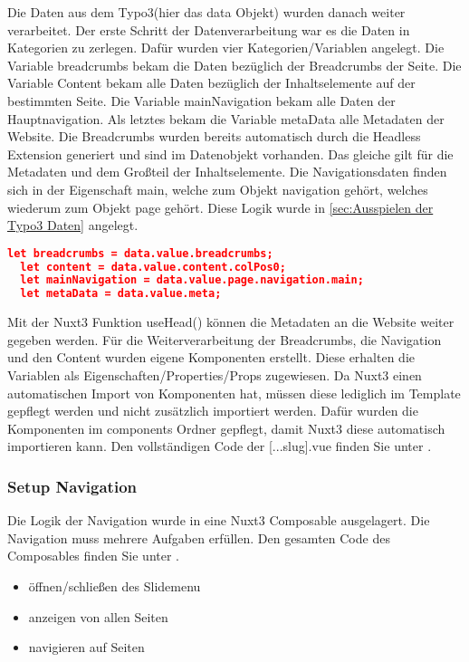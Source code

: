 Die Daten aus dem Typo3(hier das data Objekt) wurden danach weiter verarbeitet. Der erste Schritt der Datenverarbeitung war es die Daten in Kategorien zu zerlegen. Dafür wurden vier Kategorien/Variablen angelegt. Die Variable breadcrumbs bekam die Daten bezüglich der Breadcrumbs der Seite. Die Variable Content bekam alle Daten bezüglich der Inhaltselemente auf der bestimmten Seite. Die Variable mainNavigation bekam alle Daten der Hauptnavigation. Als letztes bekam die Variable metaData alle Metadaten der Website. Die Breadcrumbs wurden bereits automatisch durch die Headless Extension generiert und sind im Datenobjekt vorhanden. Das gleiche gilt für die Metadaten und dem Großteil der Inhaltselemente. Die Navigationsdaten finden sich in der Eigenschaft main, welche zum Objekt navigation gehört, welches wiederum zum Objekt page gehört. Diese Logik wurde in \ref{sec:Ausspielen der Typo3 Daten} angelegt.

\begin{lstlisting}[language=json,firstnumber=1]
  let breadcrumbs = data.value.breadcrumbs;
  let content = data.value.content.colPos0;
  let mainNavigation = data.value.page.navigation.main;
  let metaData = data.value.meta;
\end{lstlisting}

Mit der Nuxt3 Funktion useHead() können die Metadaten an die Website weiter gegeben werden. Für die Weiterverarbeitung der Breadcrumbs, die Navigation und den Content wurden eigene Komponenten erstellt. Diese erhalten die Variablen als Eigenschaften/Properties/Props zugewiesen. Da Nuxt3 einen automatischen Import von Komponenten hat, müssen diese lediglich im Template gepflegt werden und nicht zusätzlich importiert werden. Dafür wurden die Komponenten im components Ordner gepflegt, damit Nuxt3 diese automatisch importieren kann. Den vollständigen Code der [...slug].vue finden Sie unter .

\subsubsection{Setup Navigation}
\label{sec:Setup Navigation}

Die Logik der Navigation wurde in eine Nuxt3 Composable ausgelagert. Die Navigation muss mehrere Aufgaben erfüllen. Den gesamten Code des Composables finden Sie unter .

\begin{itemize}
\item öffnen/schließen des Slidemenu
\item anzeigen von allen Seiten
\item navigieren auf Seiten
\end{itemize}

